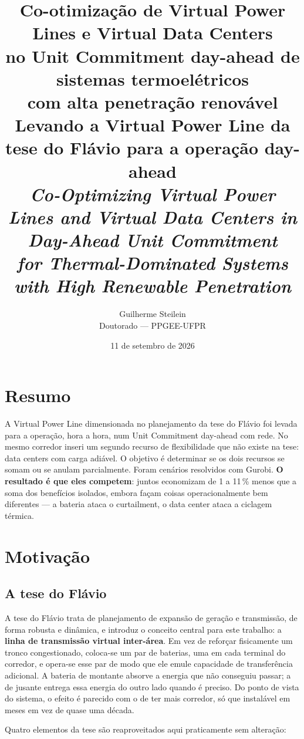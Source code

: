 \documentclass[11pt,a4paper]{article}
\title{\vspace{-1.5cm}\Large\textbf{Co-otimização de Virtual Power Lines e Virtual Data Centers\\
no Unit Commitment day-ahead de sistemas termoelétricos\\com alta penetração renovável}\\[10pt]
\large\normalfont Levando a Virtual Power Line da tese do Flávio para a operação day-ahead\\[3pt]
\small\itshape Co-Optimizing Virtual Power Lines and Virtual Data Centers in Day-Ahead Unit Commitment\\for Thermal-Dominated Systems with High Renewable Penetration}
\author{Guilherme Steilein \\ \small Doutorado --- PPGEE-UFPR}
\date{\small 11 de setembro de 2026}
\begin{document}
\maketitle
\thispagestyle{fancy}

\section*{Resumo}

A Virtual Power Line dimensionada no planejamento da tese do Flávio foi
levada para a operação, hora a hora, num Unit Commitment day-ahead com rede. No mesmo corredor
inseri um segundo recurso de flexibilidade que não existe na tese: data centers com carga adiável. O
objetivo é determinar se os dois recursos se somam ou se anulam parcialmente. Foram \numncen{} cenários
resolvidos com Gurobi. \textbf{O resultado é que eles competem}: juntos economizam de 1 a 11\,\% menos que a soma dos
benefícios isolados, embora façam coisas operacionalmente bem diferentes --- a bateria ataca o
curtailment, o data center ataca a ciclagem térmica.

\section{Motivação}

\subsection{A tese do Flávio}

A tese do Flávio trata de planejamento de expansão de geração e transmissão, de forma robusta e dinâmica,
e introduz o conceito central para este trabalho: a \textbf{linha de transmissão
virtual inter-área}. Em vez de reforçar fisicamente um tronco congestionado, coloca-se um par de baterias,
uma em cada terminal do corredor, e opera-se esse par de modo que ele emule capacidade de transferência
adicional. A bateria de montante absorve a energia que não conseguiu passar; a de jusante entrega essa
energia do outro lado quando é preciso. Do ponto de vista do sistema, o efeito é parecido com o de ter
mais corredor, só que instalável em meses em vez de quase uma década.

Quatro elementos da tese são reaproveitados aqui praticamente sem alteração:
\end{document}
